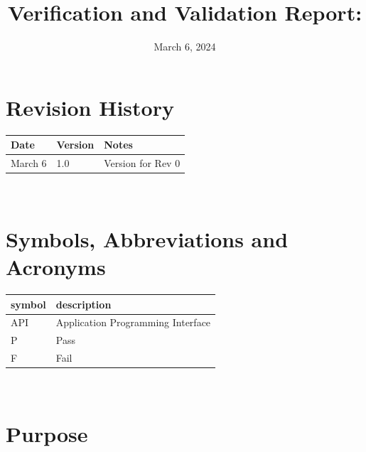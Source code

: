 \documentclass[12pt, titlepage]{article}
\begin{document}
\title{Verification and Validation Report: \progname} 
\author{\authname}
\date{March 6, 2024}
	
\maketitle


\section{Revision History}

\begin{tabularx}{\textwidth}{p{3cm}p{2cm}X}
\toprule {\bf Date} & {\bf Version} & {\bf Notes}\\
\midrule
March 6 & 1.0 & Version for Rev 0\\
\bottomrule
\end{tabularx}

~\newpage

\section{Symbols, Abbreviations and Acronyms}

\renewcommand{\arraystretch}{1.2}
\begin{tabular}{l l} 
  \toprule		
  \textbf{symbol} & \textbf{description}\\
  \midrule 
  API & Application Programming Interface\\
  P & Pass\\
  F & Fail\\
  \bottomrule
\end{tabular}\\


\newpage

\tableofcontents

\listoftables %

\listoffigures %

\newpage


\section{Purpose}
\end{document}
